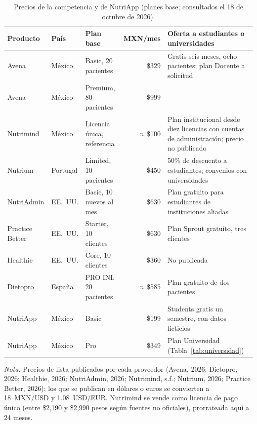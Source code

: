 \documentclass[12pt, a4paper]{article}
\begin{document}
\begin{table}[!ht]
  \centering
  \caption{Precios de la competencia y de NutriApp (planes base; consultados
  el 18 de octubre de 2026).}
  \label{tab:competencia}
  \footnotesize
  \begin{tabularx}{\textwidth}{l l l r X}
    \toprule
    \textbf{Producto} & \textbf{País} & \textbf{Plan base} & \textbf{MXN/mes} & \textbf{Oferta a estudiantes o universidades} \\
    \midrule
    Avena & México & Basic, 20 pacientes & \$329 & Gratis seis meses, ocho pacientes; plan Docente a solicitud \\
    Avena & México & Premium, 80 pacientes & \$999 & \\
    Nutrimind & México & Licencia única, referencia & $\approx$\$100 & Plan institucional desde diez licencias con cuentas de administración; precio no publicado \\
    Nutrium & Portugal & Limited, 10 pacientes & \$450 & 50\% de descuento a estudiantes; convenios con universidades \\
    NutriAdmin & EE.~UU. & Basic, 10 nuevos al mes & \$630 & Plan gratuito para estudiantes de instituciones aliadas \\
    Practice Better & EE.~UU. & Starter, 10 clientes & \$630 & Plan Sprout gratuito, tres clientes \\
    Healthie & EE.~UU. & Core, 10 clientes & \$360 & No publicada \\
    Dietopro & España & PRO INI, 20 pacientes & $\approx$\$585 & Plan gratuito de dos pacientes \\
    \midrule
    NutriApp & México & Basic & \$199 & Students gratis un semestre, con datos ficticios \\
    NutriApp & México & Pro & \$349 & Plan Universidad (Tabla~\ref{tab:universidad}) \\
    \bottomrule
  \end{tabularx}
  \begin{flushleft}
    \small\textit{Nota.} Precios de lista publicados por cada proveedor
    (Avena, 2026; Dietopro, 2026; Healthie, 2026; NutriAdmin, 2026;
    Nutrimind, s.f.; Nutrium, 2026; Practice Better, 2026); los que se
    publican en dólares o euros se convierten a 18~MXN/USD y 1.08~USD/EUR.
    Nutrimind se vende como licencia de pago único (entre \$2,190 y
    \$2,990 pesos según fuentes no oficiales), prorrateada aquí a 24 meses.
  \end{flushleft}
\end{table}
 
\end{document}

